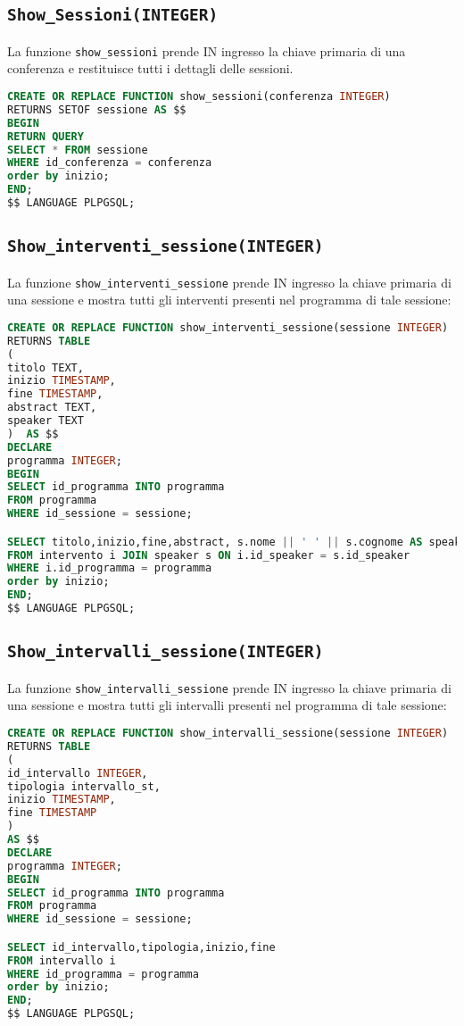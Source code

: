 \subsection{\texttt{Show\_Sessioni(INTEGER)}}
La funzione \texttt{show\_sessioni} prende IN ingresso la chiave primaria di una conferenza e restituisce tutti i dettagli delle sessioni.
\begin{lstlisting}[language=SQL, style=mystyle]
CREATE OR REPLACE FUNCTION show_sessioni(conferenza INTEGER)
RETURNS SETOF sessione AS $$
BEGIN
RETURN QUERY
SELECT * FROM sessione
WHERE id_conferenza = conferenza
order by inizio;
END;
$$ LANGUAGE PLPGSQL;
\end{lstlisting}
\subsection{\texttt{Show\_interventi\_sessione(INTEGER)}}
La funzione \texttt{show\_interventi\_sessione} prende IN ingresso la chiave primaria di una sessione e mostra tutti gli interventi presenti nel programma di tale sessione:
\begin{lstlisting}[language=SQL,style=mystyle]
CREATE OR REPLACE FUNCTION show_interventi_sessione(sessione INTEGER)
RETURNS TABLE
(
titolo TEXT,
inizio TIMESTAMP,
fine TIMESTAMP,
abstract TEXT,
speaker TEXT
)  AS $$
DECLARE 
programma INTEGER;
BEGIN
SELECT id_programma INTO programma
FROM programma
WHERE id_sessione = sessione;

SELECT titolo,inizio,fine,abstract, s.nome || ' ' || s.cognome AS speaker
FROM intervento i JOIN speaker s ON i.id_speaker = s.id_speaker
WHERE i.id_programma = programma
order by inizio;
END;
$$ LANGUAGE PLPGSQL;
\end{lstlisting}

\subsection{\texttt{Show\_intervalli\_sessione(INTEGER)}}
La funzione \texttt{show\_intervalli\_sessione} prende IN ingresso la chiave primaria di una sessione e mostra tutti gli intervalli presenti nel programma di tale sessione:
\begin{lstlisting}[language=SQL,style=mystyle]
CREATE OR REPLACE FUNCTION show_intervalli_sessione(sessione INTEGER)
RETURNS TABLE
(
id_intervallo INTEGER,
tipologia intervallo_st,
inizio TIMESTAMP,
fine TIMESTAMP
)  
AS $$
DECLARE 
programma INTEGER;
BEGIN
SELECT id_programma INTO programma
FROM programma
WHERE id_sessione = sessione;

SELECT id_intervallo,tipologia,inizio,fine
FROM intervallo i
WHERE id_programma = programma
order by inizio;
END;
$$ LANGUAGE PLPGSQL;
\end{lstlisting}
